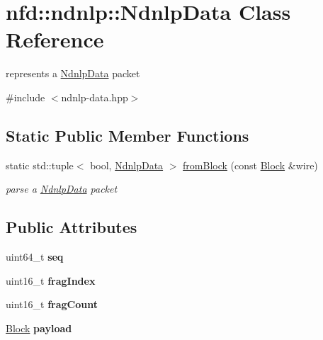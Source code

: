 \hypertarget{classnfd_1_1ndnlp_1_1NdnlpData}{}\section{nfd\+:\+:ndnlp\+:\+:Ndnlp\+Data Class Reference}
\label{classnfd_1_1ndnlp_1_1NdnlpData}


represents a \hyperlink{classnfd_1_1ndnlp_1_1NdnlpData}{Ndnlp\+Data} packet  




{\ttfamily \#include $<$ndnlp-\/data.\+hpp$>$}

\subsection*{Static Public Member Functions}
\begin{DoxyCompactItemize}
\item 
static std\+::tuple$<$ bool, \hyperlink{classnfd_1_1ndnlp_1_1NdnlpData}{Ndnlp\+Data} $>$ \hyperlink{classnfd_1_1ndnlp_1_1NdnlpData_ad7214305264d7b21b82d015a56906ae9}{from\+Block} (const \hyperlink{classndn_1_1Block}{Block} \&wire)
\begin{DoxyCompactList}\small\item\em parse a \hyperlink{classnfd_1_1ndnlp_1_1NdnlpData}{Ndnlp\+Data} packet \end{DoxyCompactList}\end{DoxyCompactItemize}
\subsection*{Public Attributes}
\begin{DoxyCompactItemize}
\item 
uint64\+\_\+t {\bfseries seq}\hypertarget{classnfd_1_1ndnlp_1_1NdnlpData_a7d461ecf6390b147637cebd1d002c573}{}\label{classnfd_1_1ndnlp_1_1NdnlpData_a7d461ecf6390b147637cebd1d002c573}

\item 
uint16\+\_\+t {\bfseries frag\+Index}\hypertarget{classnfd_1_1ndnlp_1_1NdnlpData_a96ae0f2cfb5faded2fc3e69ccb269776}{}\label{classnfd_1_1ndnlp_1_1NdnlpData_a96ae0f2cfb5faded2fc3e69ccb269776}

\item 
uint16\+\_\+t {\bfseries frag\+Count}\hypertarget{classnfd_1_1ndnlp_1_1NdnlpData_adc18949ce1a3e3cdc5931471e4f3f4ad}{}\label{classnfd_1_1ndnlp_1_1NdnlpData_adc18949ce1a3e3cdc5931471e4f3f4ad}

\item 
\hyperlink{classndn_1_1Block}{Block} {\bfseries payload}\hypertarget{classnfd_1_1ndnlp_1_1NdnlpData_aa2137968fab8498640868561363c3869}{}\label{classnfd_1_1ndnlp_1_1NdnlpData_aa2137968fab8498640868561363c3869}

\end{DoxyCompactItemize}


